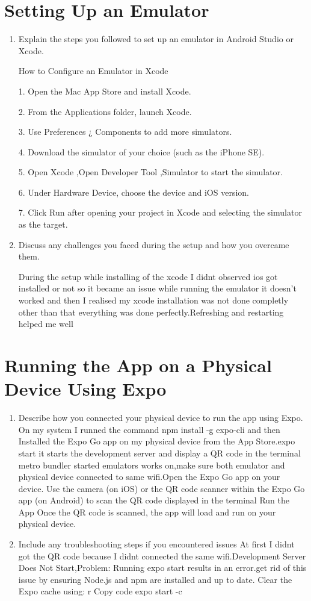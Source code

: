 \documentclass[a4paper,12pt]{article}
\begin{document}
\section{Setting Up an Emulator}
\begin{enumerate}
    \item Explain the steps you followed to set up an emulator in Android Studio or Xcode.
    
    How to Configure an Emulator in Xcode
    
 1. Open the Mac App Store and install Xcode.
 
 2. From the Applications folder, launch Xcode.
 
 3. Use Preferences ¿ Components to add more simulators.
 
 4. Download the simulator of your choice (such as the iPhone SE).
 
5. Open Xcode ,Open Developer Tool ,Simulator to start the simulator.

 6. Under Hardware  Device, choose the device and iOS version.
 
 7. Click Run after opening your project in Xcode and selecting the simulator as the target.

    \item Discuss any challenges you faced during the setup and how you overcame them.
    
During the setup while installing of the xcode I didnt observed  ios got installed or not so it became an issue while running the emulator it doesn't worked and then I realised my xcode installation was not done completly other than that everything was done perfectly.Refreshing and restarting helped me well
\end{enumerate}

 \section{Running the App on a Physical Device Using Expo}

\begin{enumerate}
    \item Describe how you connected your physical device to run the app using Expo.
    On my system I runned the command npm install -g expo-cli and then Installed the Expo Go app on my physical device from the App Store.expo start it starts the development server and display a QR code in the terminal metro bundler started emulators works on,make sure both emulator and physical device connected to same wifi.Open the Expo Go app on your device.
Use the camera (on iOS) or the QR code scanner within the Expo Go app (on Android) to scan the QR code displayed in the terminal 
Run the App Once the QR code is scanned, the app will load and run on your physical device.

    \item Include any troubleshooting steps if you encountered issues
    At first I didnt got the QR code because I didnt connected the same wifi.Development Server Does Not Start,Problem: Running expo start results in an error.get rid of this issue by ensuring Node.js and npm are installed and up to date.
Clear the Expo cache using:
r
Copy code
expo start -c
\end{enumerate}
\end{document}

